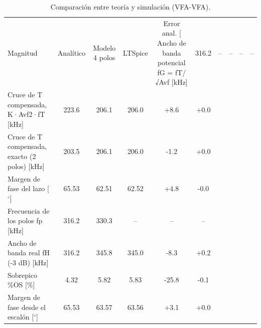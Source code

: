 \begin{table}[H]
\centering
\begin{tabular}{lccccc}
\toprule
Magnitud & Analítico & Modelo 4 polos & LTSpice & Error anal. [%
\midrule
Ancho de banda potencial fG = fT/√Avf [kHz] & 316.2 & -- & -- & -- & -- \\
Cruce de T compensada, K·Avf2·fT [kHz] & 223.6 & 206.1 & 206.0 & +8.6 & +0.0 \\
Cruce de T compensada, exacto (2 polos) [kHz] & 203.5 & 206.1 & 206.0 & -1.2 & +0.0 \\
Margen de fase del lazo [$^\circ$] & 65.53 & 62.51 & 62.52 & +4.8 & -0.0 \\
Frecuencia de los polos fp [kHz] & 316.2 & 330.3 & -- & -- & -- \\
Ancho de banda real fH (-3 dB) [kHz] & 316.2 & 345.8 & 345.0 & -8.3 & +0.2 \\
Sobrepico \%OS [\%] & 4.32 & 5.82 & 5.83 & -25.8 & -0.1 \\
Margen de fase desde el escalón [$^\circ$] & 65.53 & 63.57 & 63.56 & +3.1 & +0.0 \\
\bottomrule
\end{tabular}
\caption{Comparación entre teoría y simulación (VFA-VFA).}
\label{tab:final_c1}
\end{table}